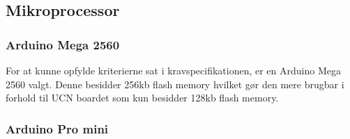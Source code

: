 \subsection{Mikroprocessor}
\subsubsection{Arduino Mega 2560}
For at kunne opfylde kriterierne sat i kravspecifikationen, er en Arduino Mega 2560 valgt. Denne besidder 256kb flash memory hvilket gør den mere brugbar i forhold til UCN boardet som kun besidder 128kb flash memory.    



\subsubsection{Arduino Pro mini}
